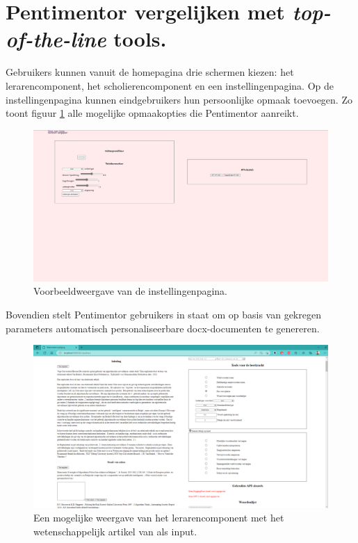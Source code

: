 \section{Pentimentor vergelijken met \textit{top-of-the-line} tools.}

Gebruikers kunnen vanuit de homepagina drie schermen kiezen: het lerarencomponent, het scholierencomponent en een instellingenpagina. Op de instellingenpagina kunnen eindgebruikers hun persoonlijke opmaak toevoegen. Zo toont figuur \ref{img:website-instellingen} alle mogelijke opmaakopties die Pentimentor aanreikt.

\begin{center}
	\begin{figure}[H]
		\includegraphics[width=\linewidth]{img/website-instellingen.png}
		\caption{Voorbeeldweergave van de instellingenpagina.}
		\label{img:website-instellingen}
	\end{figure}
\end{center}

Bovendien stelt Pentimentor gebruikers in staat om op basis van gekregen parameters automatisch personaliseerbare docx-documenten te genereren.

\begin{figure}[H]
	\includegraphics[width=\linewidth]{img/proto-lerarencomponent.png}
	\caption{Een mogelijke weergave van het lerarencomponent met het wetenschappelijk artikel van \textcite{VanBrakel2022} als input.}
	\label{img:proto-lerarencomponent}
\end{figure}

